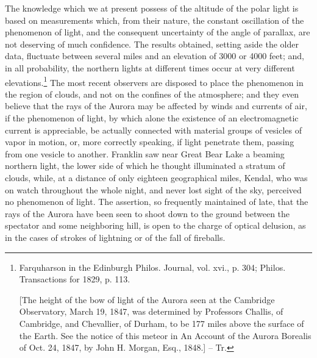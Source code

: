 The knowledge which we at present possess of the altitude of the polar light is based on measurements which, from their nature, the constant oscillation of the phenomenon of light, and the consequent uncertainty of the angle of parallax, are not deserving of much confidence. The results obtained, setting aside the older data, fluctuate between several miles and an elevation of 3000 or 4000 feet; and, in all probability, the northern lights at different times occur at very different elevations.\footnote{Farquharson in the Edinburgh Philos. Journal, vol. xvi., p. 304; Philos. Transactions for 1829, p. 113.

[The height of the bow of light of the Aurora seen at the Cambridge Observatory, March 19, 1847, was determined by Professors Challis, of Cambridge, and Chevallier, of Durham, to be 177 miles above the surface of the Earth. See the notice of this meteor in An Account of the Aurora Borealis of Oct. 24, 1847, by John H. Morgan, Esq., 1848.] -- Tr.} The most recent observers are disposed to place the phenomenon in the region of clouds, and not on the confines of the atmosphere; and they even believe that the rays of the Aurora may be affected by winds and currents of air, if the phenomenon of light, by which alone the existence of an electromagnetic current is appreciable, be actually connected with material groups of vesicles of vapor in motion, or, more correctly speaking, if light penetrate them, passing from one vesicle to another. Franklin saw near Great Bear Lake a beaming northern light, the lower side of which he thought illuminated a stratum of clouds, while, at a distance of only eighteen geographical miles, Kendal, who was on watch throughout the whole night, and never lost sight of the sky, perceived no phenomenon of light. The assertion, so frequently maintained of late, that the rays of the Aurora have been seen to shoot down to the ground between the spectator and some neighboring hill, is open to the charge of optical delusion, as in the cases of strokes of lightning or of the fall of fireballs.

